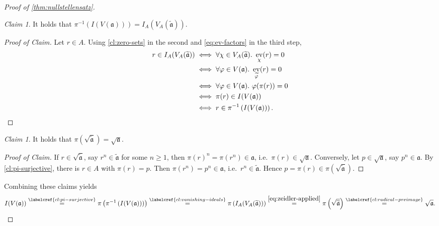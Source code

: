 \documentclass[11pt]{scrartcl}
\theoremstyle{definition}
\theoremstyle{plain}
\theoremstyle{remark}
\newtheorem{claim}[definition]{Claim}
\newenvironment{claimproof}[1][Proof of Claim]{\begin{proof}[#1] \renewcommand{\qedsymbol}{$\lrcorner$}}{ \end{proof}}
\renewcommand\phi\varphi
\DeclareMathOperator{\ev}{ev}
\begin{document}
\begin{proof}[Proof of \cref{thm:nullstellensatz}]
		\begin{claim}\label{cl:vanishing-ideals}
			It holds that $\pi^{-1}\left(I(V(\mathfrak{a}))\right) = I_A(V_A(\widetilde{\mathfrak{a}}))$.
		\end{claim}
		\begin{claimproof}
			Let $r \in A$.
			Using \cref{cl:zero-sets} in the second and \eqref{eq:ev-factors} in the third step,
			\begin{align*}
				r \in I_A(V_A(\widetilde{\mathfrak{a}}))
				&\iff \forall \chi \in V_A(\widetilde{\mathfrak{a}}).\ \ev_{\chi}(r) = 0\\
				&\iff \forall \phi \in V(\mathfrak{a}).\ \ev_{\widetilde\phi}(r) = 0\\
				&\iff \forall \phi \in V(\mathfrak{a}).\ \phi(\pi(r)) = 0\\
				&\iff \pi(r) \in I(V(\mathfrak{a}))\\
				&\iff r \in \pi^{-1}\left(I(V(\mathfrak{a}))\right). \qedhere
			\end{align*}
		\end{claimproof}

		\begin{claim}\label{cl:radical-preimage}
			It holds that $\pi\left(\sqrt{\widetilde{\mathfrak{a}}}\right) = \sqrt{\mathfrak{a}}$.
		\end{claim}
		\begin{claimproof}
			If $r \in \sqrt{\widetilde{\mathfrak{a}}}$,
			say $r^n \in \widetilde{\mathfrak{a}}$ for some $n \geq 1$,
			then $\pi(r)^n = \pi(r^n) \in \mathfrak{a}$,
			i.e.\ $\pi(r) \in \sqrt{\mathfrak{a}}$.
			Conversely, let $p \in \sqrt{\mathfrak{a}}$, say $p^n \in \mathfrak{a}$.
			By \cref{cl:pi-surjective}, there is $r \in A$ with $\pi(r) = p$.
			Then $\pi(r^n) = p^n \in \mathfrak{a}$, i.e.\ $r^n \in \widetilde{\mathfrak{a}}$.
			Hence $p = \pi(r) \in \pi\left(\sqrt{\widetilde{\mathfrak{a}}}\right)$.
		\end{claimproof}

		Combining these claims yields
		\[
			I(V(\mathfrak{a}))
			\overset{\labelcref{cl:pi-surjective}}{=} \pi\left(\pi^{-1}\left(I(V(\mathfrak{a}))\right)\right)
			\overset{\labelcref{cl:vanishing-ideals}}{=} \pi\left(I_A(V_A(\widetilde{\mathfrak{a}}))\right)
			\overset{\eqref{eq:zeidler-applied}}{=} \pi\left(\sqrt{\widetilde{\mathfrak{a}}}\right)
			\overset{\labelcref{cl:radical-preimage}}{=} \sqrt{\mathfrak{a}}. \qedhere
		\]
	\end{proof}
\end{document}
